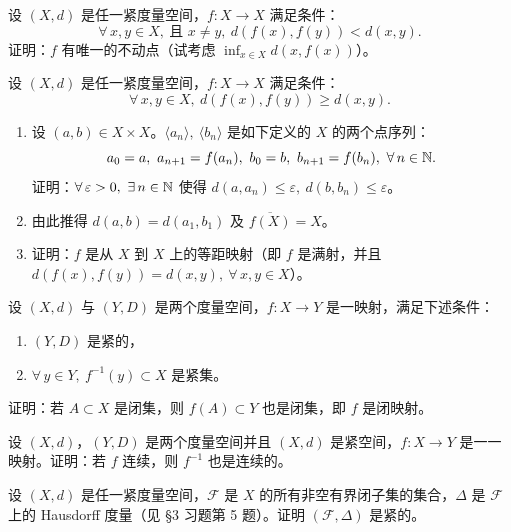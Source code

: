 \begin{exercise}
	\item 设 $(X,d)$ 是任一紧度量空间，$f:X\to X$ 满足条件：
	\[\forall\,x,y\in X,\ \text{且 }x\neq y,\ d(f(x),f(y))<d(x,y).\]
	证明：$f$ 有唯一的不动点（试考虑 $\displaystyle\inf_{x\in X}d(x,f(x))$）。
\end{exercise}

\begin{exercise}
	\item 设 $(X,d)$ 是任一紧度量空间，$f:X\to X$ 满足条件：
	\[\forall\,x,y\in X,\ d(f(x),f(y))\geqslant d(x,y).\]
	\begin{enumerate}[label=\arabic*)]
		\item 设 $(a,b)\in X\times X$。$\langle a_n\rangle,\ \langle b_n\rangle$ 是如下定义的 $X$ 的两个点序列：
		\[a_0=a,\ a_{n+1}=f(a_n),\ b_0=b,\ b_{n+1}=f(b_n),\ \forall\,n\in\N.\]
		证明：$\forall\,\varepsilon>0,\ \exists\,n\in\mathbb{N}$ 使得 $d(a,a_n)\leqslant\varepsilon,\ d(b,b_n)\leqslant\varepsilon$。
		\item 由此推得 $d(a,b)=d(a_1,b_1)$ 及 $\overline{f(X)}=X$。
		\item 证明：$f$ 是从 $X$ 到 $X$ 上的等距映射（即 $f$ 是满射，并且 $d(f(x),f(y))=d(x,y),\ \forall\,x,y\in X$）。
	\end{enumerate}
\end{exercise}

\begin{exercise}
	\item 设 $(X,d)$ 与 $(Y,D)$ 是两个度量空间，$f:X\to Y$ 是一映射，满足下述条件：
	\begin{enumerate}[label=\arabic*)]
		\item $(Y,D)$ 是紧的，
		\item $\forall\,y\in Y,\ f^{-1}(y)\subset X$ 是紧集。
	\end{enumerate}
	证明：若 $A\subset X$ 是闭集，则 $f(A)\subset Y$ 也是闭集，即 $f$ 是闭映射。
\end{exercise}

\begin{exercise}
	\item 设 $(X,d)$，$(Y,D)$ 是两个度量空间并且 $(X,d)$ 是紧空间，$f:X\to Y$ 是一一映射。证明：若 $f$ 连续，则 $f^{-1}$ 也是连续的。
\end{exercise}

\begin{exercise}
	\item 设 $(X,d)$ 是任一紧度量空间，$\mathscr{F}$ 是 $X$ 的所有非空有界闭子集的集合，$\Delta$ 是 $\mathscr{F}$ 上的 Hausdorff 度量（见 §3 习题第 5 题）。证明 $(\mathscr{F},\Delta)$ 是紧的。
\end{exercise}

